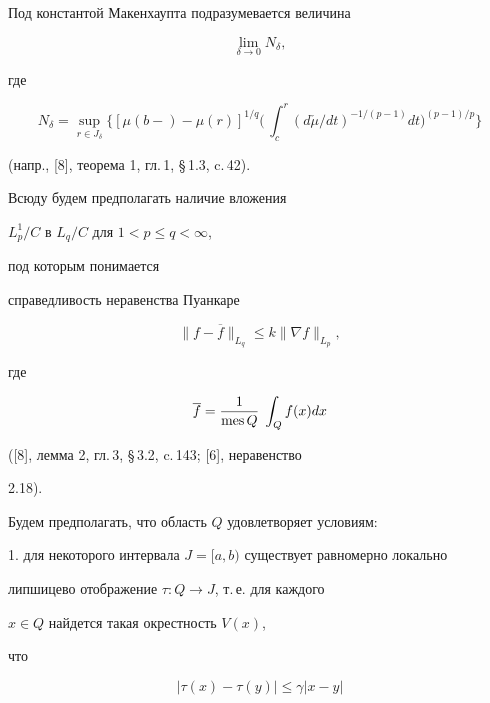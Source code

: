 Под константой Макенхаупта подразумевается величина


\begin{equation}


\lim_{\delta\to 0} N_{\delta},


\end{equation}


где


$$


N_{\delta}= \sup\limits_{r\in J_{\delta}}\biggl\{[\mu(b-)-\mu(r)]^{1/q}


\biggl(\,\int_c^r(d\check\mu/dt )^{-1/(p-1)}dt\biggr)^{(p-1)/p}\biggr\}


$$


(напр., [8], теорема 1, гл.\,1, \S\,1.3, c.\,42).





Всюду будем предполагать наличие вложения


$L_p^1/C$  в $L_q/C$ для $1<p\le q<\infty$,


под которым понимается


справедливость неравенства Пуанкаре


\begin{equation}


\|f-\overline f\|_{L_q}\le k \|\nabla f\|_{L_p},


\end{equation}


где


$$


\overline f =\frac{1}{\mes Q}\;\int_Qf(x)dx


$$


([8], лемма 2, гл.\,3, \S\,3.2, c.\,143; [6], неравенство


2.18).





Будем предполагать, что область $Q$ удовлетворяет условиям:





1. для некоторого интервала $J=[a,b)$ существует равномерно локально


липшицево отображение $\tau :Q\to J$, т.\,е. для каждого


$x\in Q$ найдется такая окрестность $V(x)$,


что


\begin{equation}


|\tau (x)-\tau (y)|\le \gamma | x-y|


\end{equation}


